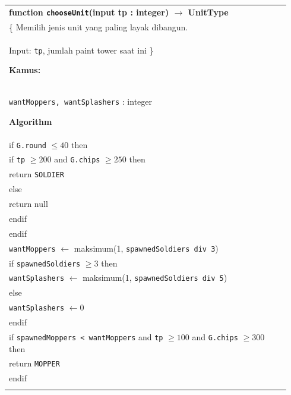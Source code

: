 \documentclass{article}
\newenvironment{pseudobox}
{
\centering
\begin{longtable}{|p{0.94\linewidth}|}
\hline
}
{
\\ \hline
\end{longtable}
\vspace{0.05cm}
}
\begin{document}
\begin{enumerate}[label=\alph*.]
\begin{enumerate}[label=\alph*.]
\begin{pseudobox}
\textbf{function \texttt{chooseUnit}(input tp : integer) $\rightarrow$ UnitType} \\
\{ Memilih jenis unit yang paling layak dibangun. \\
Input: \texttt{tp}, jumlah paint tower saat ini
\}

\textbf{Kamus:} \\
\hspace*{1.5em}\texttt{wantMoppers, wantSplashers} : integer

\textbf{Algorithm} \\
\hspace*{1.5em}if \texttt{G.round} $\leq 40$ then \\
\hspace*{3em}if \texttt{tp} $\geq 200$ and \texttt{G.chips} $\geq 250$ then \\
\hspace*{4.5em}return \texttt{SOLDIER} \\
\hspace*{3em}else \\
\hspace*{4.5em}return null \\
\hspace*{3em}endif \\
\hspace*{1.5em}endif \\

\hspace*{1.5em}\texttt{wantMoppers} $\leftarrow$ maksimum(1, \texttt{spawnedSoldiers div 3}) \\

\hspace*{1.5em}if \texttt{spawnedSoldiers} $\geq 3$ then \\
\hspace*{3em}\texttt{wantSplashers} $\leftarrow$ maksimum(1, \texttt{spawnedSoldiers div 5}) \\
\hspace*{1.5em}else \\
\hspace*{3em}\texttt{wantSplashers} $\leftarrow 0$ \\
\hspace*{1.5em}endif \\

\hspace*{1.5em}if \texttt{spawnedMoppers < wantMoppers} and \texttt{tp} $\geq 100$ and \texttt{G.chips} $\geq 300$ then \\
\hspace*{3em}return \texttt{MOPPER} \\
\hspace*{1.5em}endif \\


\end{pseudobox}
\end{enumerate}
\end{enumerate}
\end{document}
